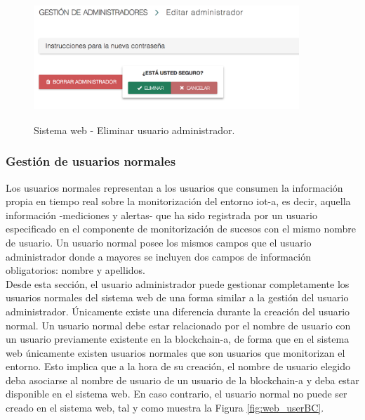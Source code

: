 \documentclass[12pt,a4paper, twoside]{report}
\begin{document}
\begin{itemize}
			\begin{figure}[!ht]   
				\caption{Sistema web - Eliminar usuario administrador.} 
				\begin{center}
	 				\includegraphics[width=10cm, height=4cm]{Images/userGuide/web/adminDelete} \\
	 				\label{fig:web_adminDelete} 
				\end{center}  	
			\end{figure}
					
	\end{itemize}
								
	\subsubsection{Gestión de usuarios normales}
	
	Los usuarios normales representan a los usuarios que consumen la información propia en tiempo real sobre la monitorización del entorno \gls{iot-a}, es decir, aquella información -mediciones y alertas- que ha sido registrada por un usuario especificado en el componente de monitorización de sucesos con el mismo nombre de usuario. Un usuario normal posee los mismos campos que el usuario administrador donde a mayores se incluyen dos campos de información obligatorios: nombre y apellidos. \\
	
	Desde esta sección, el usuario administrador puede gestionar completamente los usuarios normales del sistema web de una forma similar a la gestión del usuario administrador. Únicamente existe una diferencia durante la creación del usuario normal. Un usuario normal debe estar relacionado por el nombre de usuario con un usuario previamente existente en la \gls{blockchain-a}, de forma que en el sistema web únicamente existen usuarios normales que son usuarios que monitorizan el entorno. Esto implica que a la hora de su creación, el nombre de usuario elegido deba asociarse al nombre de usuario de un usuario de la \gls{blockchain-a} y deba estar disponible en el sistema web. En caso contrario, el usuario normal no puede ser creado en el sistema web, tal y como muestra la Figura \ref{fig:web_userBC}.
				
\end{document}
